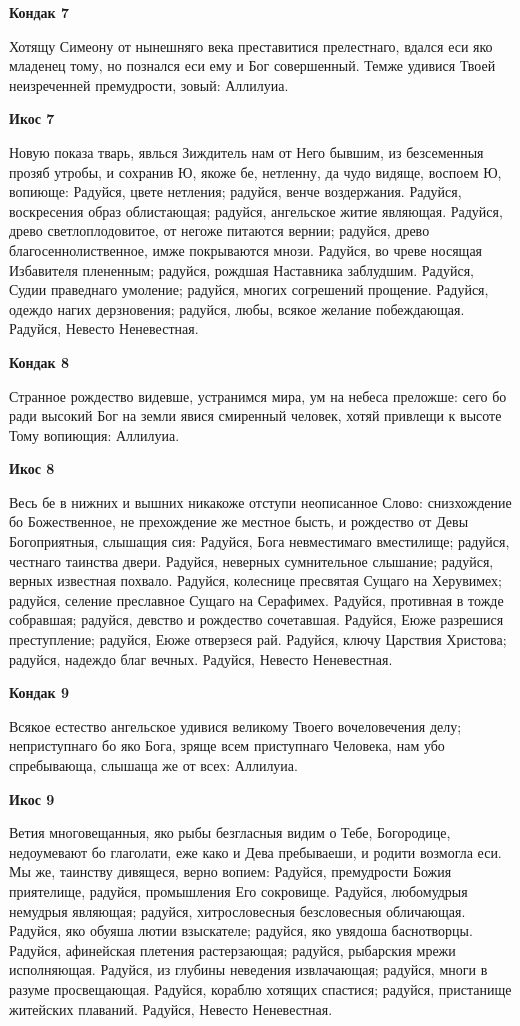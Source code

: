 \bfseries Кондак 7\normalfont{}


Хотящу Симеону от нынешняго века преставитися прелестнаго, вдался еси яко младенец тому, но познался еси ему и Бог совершенный. Темже удивися Твоей неизреченней премудрости, зовый: Аллилуиа.


\bfseries Икос 7\normalfont{}


Новую показа тварь, явлься Зиждитель нам от Него бывшим, из безсеменныя прозяб утробы, и сохранив Ю, якоже бе, нетленну, да чудо видяще, воспоем Ю, вопиюще: Радуйся, цвете нетления; радуйся, венче воздержания. Радуйся, воскресения образ облистающая; радуйся, ангельское житие являющая. Радуйся, древо светлоплодовитое, от негоже питаются вернии; радуйся, древо благосеннолиственное, имже покрываются мнози. Радуйся, во чреве носящая Избавителя плененным; радуйся, рождшая Наставника заблудшим. Радуйся, Судии праведнаго умоление; радуйся, многих согрешений прощение. Радуйся, одеждо нагих дерзновения; радуйся, любы, всякое желание побеждающая. Радуйся, Невесто Неневестная.


\bfseries Кондак 8\normalfont{}


Странное рождество видевше, устранимся мира, ум на небеса преложше: сего бо ради высокий Бог на земли явися смиренный человек, хотяй привлещи к высоте Тому вопиющия: Аллилуиа.


\bfseries Икос 8\normalfont{}


Весь бе в нижних и вышних никакоже отступи неописанное Слово: снизхождение бо Божественное, не прехождение же местное бысть, и рождество от Девы Богоприятныя, слышащия сия: Радуйся, Бога невместимаго вместилище; радуйся, честнаго таинства двери. Радуйся, неверных сумнительное слышание; радуйся, верных известная похвало. Радуйся, колеснице пресвятая Сущаго на Херувимех; радуйся, селение преславное Сущаго на Серафимех. Радуйся, противная в тожде собравшая; радуйся, девство и рождество сочетавшая. Радуйся, Еюже разрешися преступление; радуйся, Еюже отверзеся рай. Радуйся, ключу Царствия Христова; радуйся, надеждо благ вечных. Радуйся, Невесто Неневестная.


\bfseries Кондак 9\normalfont{}


Всякое естество ангельское удивися великому Твоего вочеловечения делу; неприступнаго бо яко Бога, зряще всем приступнаго Человека, нам убо спребывающа, слышаща же от всех: Аллилуиа.


\bfseries Икос 9\normalfont{}


Ветия многовещанныя, яко рыбы безгласныя видим о Тебе, Богородице, недоумевают бо глаголати, еже како и Дева пребываеши, и родити возмогла еси. Мы же, таинству дивящеся, верно вопием: Радуйся, премудрости Божия приятелище, радуйся, промышления Его сокровище. Радуйся, любомудрыя немудрыя являющая; радуйся, хитрословесныя безсловесныя обличающая. Радуйся, яко обуяша лютии взыскателе; радуйся, яко увядоша баснотворцы. Радуйся, афинейская плетения растерзающая; радуйся, рыбарския мрежи исполняющая. Радуйся, из глубины неведения извлачающая; радуйся, многи в разуме просвещающая. Радуйся, кораблю хотящих спастися; радуйся, пристанище житейских плаваний. Радуйся, Невесто Неневестная.


